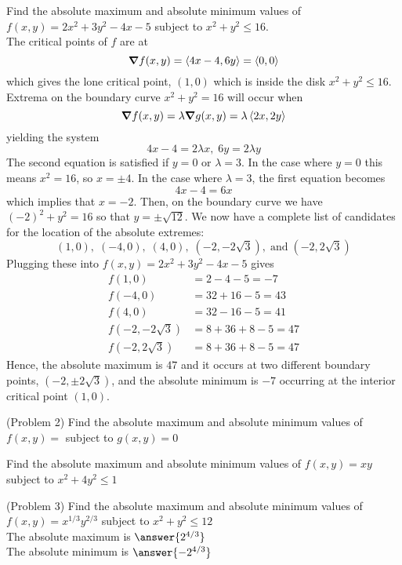 \documentclass[handout]{ximera}
\begin{document}
\begin{example}[Example 2]
Find the absolute maximum and absolute minimum values of $f(x,y) = 2x^2 + 3y^2 - 4x - 5$ subject to $x^2 + y^2 \leq 16$.\\
The critical points of $f$ are at
\[
\boldsymbol\nabla f(x,y) = \left\langle 4x -4, 6y\right\rangle = \left\langle 0,0\right\rangle
\]
 which gives the lone critical point, $(1,0)$ which is inside the disk $x^2 + y^2 \leq 16$.\\
 Extrema on the boundary curve $x^2 + y^2 = 16$ will occur when
 \[
 \boldsymbol\nabla f(x,y) = \lambda \boldsymbol\nabla g(x,y) = \lambda \left\langle 2x, 2y\right\rangle
 \]
 yielding the system
 \[
 4x - 4 = 2\lambda x, \; 6y = 2\lambda y
 \]
 The second equation is satisfied if $y = 0$ or $\lambda = 3$.  In the case where $y = 0$ this means $x^2 = 16$, so $x = \pm 4$.
 In the case where $\lambda = 3$, the first equation becomes
 \[
 4x - 4 = 6x 
 \]
 which implies that $x = -2$.  Then, on the boundary curve we have $(-2)^2 + y^2 = 16$ so that $y = \pm \sqrt{12}$.
 We now have a complete list of candidates for the location of the absolute extremes:
 \[
 (1,0), \; (-4, 0), \; (4,0), \; (-2, -2\sqrt3), \;\text{and} \; (-2, 2\sqrt 3)
 \]
 Plugging these into $f(x,y) = 2x^2 + 3y^2 - 4x - 5$ gives
 \begin{align*}
 f(1,0) &= 2-4-5=-7\\
 f(-4, 0) &= 32 +16 -5 = 43\\
 f(4, 0) &= 32 -16 -5 = 41\\
 f(-2, -2\sqrt3) &= 8 + 36 +8-5 = 47\\
 f(-2, 2\sqrt3) &= 8 + 36 +8-5 = 47
 \end{align*}
 Hence, the absolute maximum is $47$ and it occurs at two different boundary points, $(-2, \pm 2\sqrt 3)$,
 and the absolute minimum is $-7$ occurring at the interior critical point $(1,0)$.
 
 
\end{example}

\begin{problem}(Problem 2)
Find the absolute maximum and absolute minimum values of $f(x,y) = $ subject to $g(x,y) = 0$\\
\end{problem}

\begin{example}[Example 3]
Find the absolute maximum and absolute minimum values of $f(x,y) = xy$ subject to $x^2 + 4y^2 \leq 1$\\
\end{example}

\begin{problem}(Problem 3)
Find the absolute maximum and absolute minimum values of $f(x,y) = x^{1/3}y^{2/3}$ subject to $x^2 + y^2 \leq 12$\\
The absolute maximum is $\answer{2^{4/3}}$\\
The absolute minimum is $\answer{-2^{4/3}}$
\end{problem}
\end{document}
